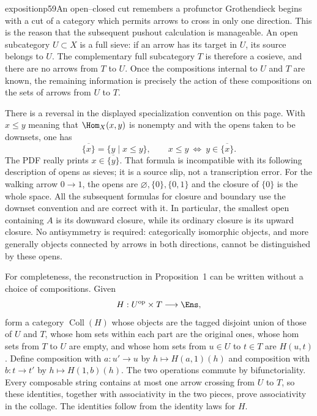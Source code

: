 
\begin{dcomment}{exposition}{p59}{An open--closed cut remembers a profunctor}
Grothendieck begins with a cut of a category which permits arrows to cross in only one direction. This is the reason that the subsequent pushout calculation is manageable. An open subcategory $U\subset X$ is a full sieve: if an arrow has its target in $U$, its source belongs to $U$. The complementary full subcategory $T$ is therefore a cosieve, and there are no arrows from $T$ to $U$. Once the compositions internal to $U$ and $T$ are known, the remaining information is precisely the action of these compositions on the sets of arrows from $U$ to $T$.

There is a reversal in the displayed specialization convention on this page. With $x\leq y$ meaning that $\Hom_X(x,y)$ is nonempty and with the opens taken to be downsets, one has
\[
 \overline{\{x\}}=\{y\mid x\leq y\},\qquad
 x\leq y\ \Longleftrightarrow\ y\in\overline{\{x\}}.
\]
The PDF really prints $x\in\overline{\{y\}}$. That formula is incompatible with its following description of opens as sieves; it is a source slip, not a transcription error. For the walking arrow $0\to1$, the opens are $\varnothing,\{0\},\{0,1\}$ and the closure of $\{0\}$ is the whole space. All the subsequent formulas for closure and boundary use the downset convention and are correct with it. In particular, the smallest open containing $A$ is its downward closure, while its ordinary closure is its upward closure. No antisymmetry is required: categorically isomorphic objects, and more generally objects connected by arrows in both directions, cannot be distinguished by these opens.

For completeness, the reconstruction in Proposition~1 can be written without a choice of compositions. Given
\[
 H:U^{\mathrm{op}}\times T\longrightarrow\Ens,
\]
form a category $\operatorname{Coll}(H)$ whose objects are the tagged disjoint union of those of $U$ and $T$, whose hom sets within each part are the original ones, whose hom sets from $T$ to $U$ are empty, and whose hom sets from $u\in U$ to $t\in T$ are $H(u,t)$. Define composition with $a:u'\to u$ by $h\mapsto H(a,1)(h)$ and composition with $b:t\to t'$ by $h\mapsto H(1,b)(h)$. The two operations commute by bifunctoriality. Every composable string contains at most one arrow crossing from $U$ to $T$, so these identities, together with associativity in the two pieces, prove associativity in the collage. The identities follow from the identity laws for $H$.


\end{dcomment}
